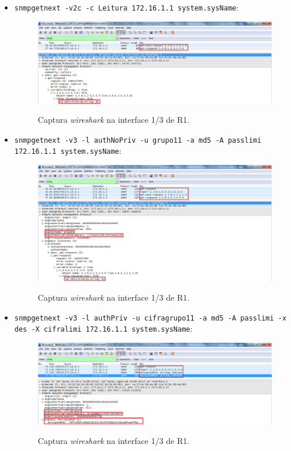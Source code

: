 \begin{itemize}

\item \texttt{snmpgetnext -v2c -c Leitura 172.16.1.1 system.sysName}:

\begin{figure}[h]
\centering
\includegraphics[width=1\textwidth, height=0.25\textheight]{8a1.png}
\label{fig:14-capturaWireshark}
\caption{Captura \emph{wireshark} na interface \textsf{1/3} de \textsf{R1}.}
\end{figure}

\newpage

\item \texttt{snmpgetnext -v3 -l authNoPriv -u grupo11 -a md5 -A passlimi 172.16.1.1 system.sysName}:

\begin{figure}[h]
\centering
\includegraphics[width=1\textwidth, height=0.35\textheight]{8a2.png}
\label{fig:15-capturaWireshark}
\caption{Captura \emph{wireshark} na interface \textsf{1/3} de \textsf{R1}.}
\end{figure}


\item \texttt{snmpgetnext -v3 -l authPriv -u cifragrupo11 -a md5 -A passlimi -x des -X cifralimi 172.16.1.1 system.sysName}:

\begin{figure}[h]
\centering
\includegraphics[width=1\textwidth, height=0.25\textheight]{8a3.png}
\label{fig:16-capturaWireshark}
\caption{Captura \emph{wireshark} na interface \textsf{1/3} de \textsf{R1}.}
\end{figure}


\end{itemize}
